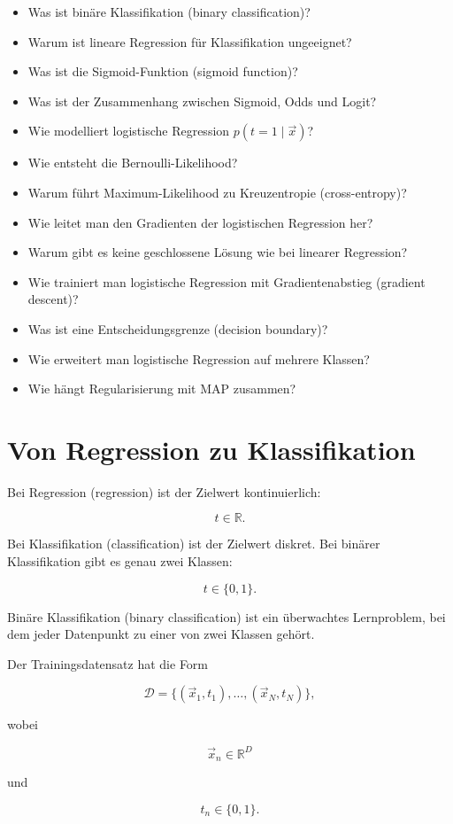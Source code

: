 \begin{itemize}
    \item Was ist binäre Klassifikation (binary classification)?
    \item Warum ist lineare Regression für Klassifikation ungeeignet?
    \item Was ist die Sigmoid-Funktion (sigmoid function)?
    \item Was ist der Zusammenhang zwischen Sigmoid, Odds und Logit?
    \item Wie modelliert logistische Regression \(p(t=1\mid\vec{x})\)?
    \item Wie entsteht die Bernoulli-Likelihood?
    \item Warum führt Maximum-Likelihood zu Kreuzentropie (cross-entropy)?
    \item Wie leitet man den Gradienten der logistischen Regression her?
    \item Warum gibt es keine geschlossene Lösung wie bei linearer Regression?
    \item Wie trainiert man logistische Regression mit Gradientenabstieg (gradient descent)?
    \item Was ist eine Entscheidungsgrenze (decision boundary)?
    \item Wie erweitert man logistische Regression auf mehrere Klassen?
    \item Wie hängt Regularisierung mit MAP zusammen?
\end{itemize}

\section{Von Regression zu Klassifikation}

Bei Regression (regression) ist der Zielwert kontinuierlich:

\[
    t \in \mathbb{R}.
\]

Bei Klassifikation (classification) ist der Zielwert diskret.
Bei binärer Klassifikation gibt es genau zwei Klassen:

\[
    t \in \{0,1\}.
\]

\begin{definitionbox}
Binäre Klassifikation (binary classification) ist ein überwachtes Lernproblem, bei dem jeder Datenpunkt zu einer von zwei Klassen gehört.

Der Trainingsdatensatz hat die Form

\[
    \mathcal{D}
    =
    \{(\vec{x}_1,t_1),\dots,(\vec{x}_N,t_N)\},
\]

wobei

\[
    \vec{x}_n \in \mathbb{R}^D
\]

und

\[
    t_n \in \{0,1\}.
\]
\end{definitionbox}

